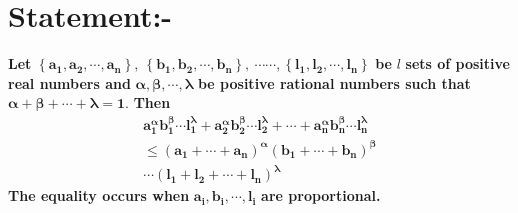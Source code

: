 \documentclass[12pt]{article}
\begin{document}
\thispagestyle{empty}


\section{Statement:-}

\textbf{Let }$\boldsymbol{\left\{a_{1}, a_{2}, \cdots, a_{n} \right\},\ \left\{b_{1}, b_{2}, \cdots, b_{n}\right\} ,\ \cdots\cdots ,}$\linebreak $\boldsymbol{ \left\{l_{1}, l_{2}, \cdots, l_{n}\right\}}$ \textbf{be }$l $ \textbf{sets of positive real numbers and }$\boldsymbol{\alpha, \beta, \cdots,\lambda}$\textbf{ be positive rational numbers such that }$\boldsymbol{\alpha+\beta+\cdots+\lambda=1 .}$ \textbf{Then}
\begin{multline*}
\boldsymbol{a_{1}^{\alpha} b_{1}^{\beta} \cdots l_{1}^{\lambda}+a_{2}^{\alpha} b_{2}^{\beta} \cdots l_{2}^{\lambda}+\cdots + a_{n}^{\alpha} b_{n}^{\beta} \cdots l_{n}^{\lambda}}\\ 
\boldsymbol{ \leq \left( a_{1}+\cdots+a_{n} \right)^{\alpha} \left( b_{1}+\cdots +b_{n}\right)^{\beta} } \\ 
\boldsymbol{ \cdots \left(l_{1}+l_{2}+\cdots+l_{n}\right)^{\lambda} }
\end{multline*}
\textbf{The equality occurs when }$ \boldsymbol{a_i,b_i, \cdots,l_i} $ \textbf{are proportional.}
\end{document}
